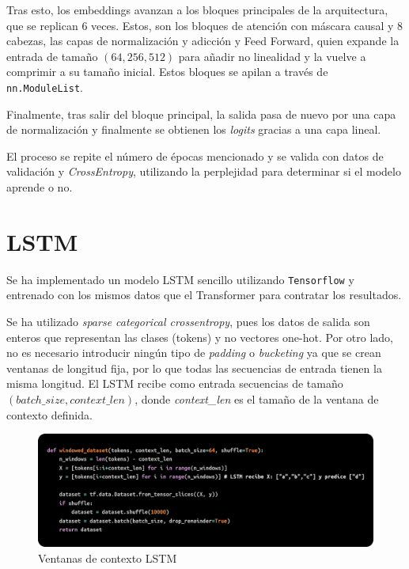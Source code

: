 \documentclass[11pt]{book}
\begin{document}
Tras esto, los embeddings avanzan a los bloques principales de la arquitectura, que se replican $6$ veces. Estos, son los bloques de atención con máscara causal y 8 cabezas, las capas de normalización y adicción y Feed Forward, quien expande la entrada de tamaño $(64,256, 512)$ para añadir no linealidad y la vuelve a comprimir a su tamaño inicial. Estos bloques se apilan a través de \texttt{nn.ModuleList}. 

Finalmente, tras salir del bloque principal, la salida pasa de nuevo por una capa de normalización y finalmente se obtienen los \textit{logits} gracias a una capa lineal. 

El proceso se repite el número de épocas mencionado y se valida con datos de validación y \textit{CrossEntropy}, utilizando la perplejidad para determinar si el modelo aprende o no.


\section{LSTM}

Se ha implementado un modelo LSTM sencillo utilizando \texttt{Tensorflow} y entrenado con los mismos datos que el Transformer para contratar los resultados. 

Se ha utilizado \textit{sparse categorical crossentropy}, pues los datos de salida son enteros que representan las clases (tokens) y no vectores one-hot. Por otro lado, no es necesario introducir ningún tipo de \textit{padding} o \textit{bucketing} ya que se crean ventanas de longitud fija, por lo que todas las secuencias de entrada tienen la misma longitud. El LSTM recibe como entrada secuencias de tamaño $(batch\_size, context\_len)$, donde \textit{context\_len} es el tamaño de la ventana de contexto definida.

\begin{figure}[h]
    \centering
    \includegraphics[width=0.5\linewidth]{img/window_lstm.png}
    \caption{Ventanas de contexto LSTM}
    \label{fig:placeholder24}
\end{figure}
\end{document}
